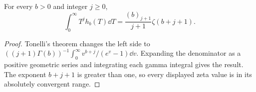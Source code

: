 \begin{lemma}\label{frac:lem:moments}
For every $b>0$ and integer $j\ge0$,
\begin{equation}\label{frac:eq:moments}
 \int_0^\infty T^j h_b(T)\dd T
   =\frac{(b)_{j+1}}{j+1}\zeta(b+j+1).
\end{equation}
\end{lemma}
\begin{proof}
Tonelli's theorem changes the left side to
$((j+1)\Gamma(b))^{-1}\int_0^\infty
v^{b+j}/(e^v-1)\dd v$. Expanding the denominator as a positive
geometric series and integrating each gamma integral gives the result.
The exponent $b+j+1$ is greater than one, so every displayed zeta
value is in its absolutely convergent range.
\end{proof}

